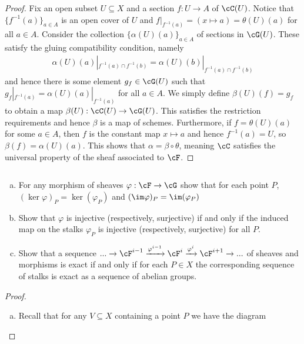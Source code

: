 \begin{problemset}
\begin{proof}
		Fix an open subset $U \subseteq X$ and a section $f:U\to A$ of $\cC(U)$. Notice that $\{f^{-1}(a)\}_{a\in A}$ is an open cover of $U$ and $f|_{f^{-1}(a)} = (x\mapsto a) = \theta(U)(a)$ for all $a \in A$. Consider the collection $\{\alpha(U)(a)\}_{a\in A}$ of sections in $\cG(U)$. These satisfy the gluing compatibility condition, namely
		\begin{align*}
			\alpha(U)(a)|_{f^{-1}(a)\cap f^{-1}(b)} = \alpha(U)(b)|_{f^{-1}(a)\cap f^{-1}(b)}
		\end{align*}
		and hence there is some element $g_f \in \cG(U)$ such that $g_f|_{f^{-1}(a)} = \alpha(U)(a)|_{f^{-1}(a)}$ for all $a \in A$. We simply define $\beta(U)(f) = g_f$ to obtain a map $\beta(U):\cC(U)\to \cG(U)$. This satisfies the restriction requirements and hence $\beta$ is a map of schemes. Furthermore, if $f = \theta(U)(a)$ for some $a \in A$, then $f$ is the constant map $x \mapsto a$ and hence $f^{-1}(a) = U$, so $\beta(f) = \alpha(U)(a)$. This shows that $\alpha = \beta\circ \theta$, meaning $\cC$ satisfies the universal property of the sheaf associated to $\cF$.
	\end{proof}
\item\label{prob:2_1_2} $ $
	\begin{enumerate}[(a)]
		\item For any morphism of sheaves $\varphi:\cF\to \cG$ show that for each point $P$, $(\ker\varphi)_P = \ker(\varphi_P)$ and $(\im\varphi)_P = \im(\varphi_P)$
		\item Show that $\varphi$ is injective (respectively, surjective) if and only if the induced map on the stalks $\varphi_P$ is injective (respectively, surjective) for all $P$.
		\item Show that a sequence $...\to \cF^{i-1}\xrightarrow{\varphi^{i-1}} \cF^i \xrightarrow{\varphi^i}\cF^{i+1}\to ...$ of sheaves and morphisms is exact if and only if for each $P\in X$ the corresponding sequence of stalks is exact as a sequence of abelian groups.
	\end{enumerate}
	\begin{proof}$ $
		\begin{enumerate}[(a)]
			\item Recall that for any $V\subseteq X$ containing a point $P$ we have the diagram
				\begin{center}
\end{center}
\end{enumerate}
\end{proof}
\end{problemset}
